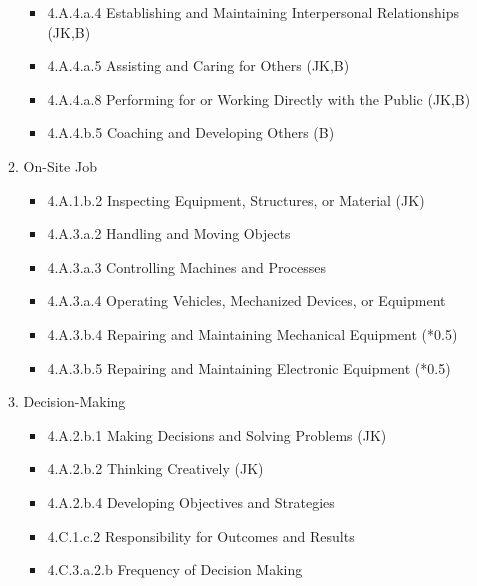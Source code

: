 \begin{enumerate}[A.]
\begin{enumerate}[1.]
\begin{itemize}
  \item 4.A.4.a.4 Establishing and Maintaining Interpersonal Relationships (JK,B)
  \item 4.A.4.a.5 Assisting and Caring for Others (JK,B) 
  \item 4.A.4.a.8 Performing for or Working Directly with the Public (JK,B) 
  \item 4.A.4.b.5 Coaching and Developing Others (B)
\end{itemize}
\item On-Site Job 
\begin{itemize}
  \item 4.A.1.b.2 Inspecting Equipment, Structures, or Material (JK) 
  \item 4.A.3.a.2 Handling and Moving Objects 
  \item 4.A.3.a.3 Controlling Machines and Processes 
  \item 4.A.3.a.4 Operating Vehicles, Mechanized Devices, or Equipment 
  \item 4.A.3.b.4 Repairing and Maintaining Mechanical Equipment (*0.5) 
  \item 4.A.3.b.5 Repairing and Maintaining Electronic Equipment (*0.5)
\end{itemize}
\item Decision-Making 
\begin{itemize}
\item 4.A.2.b.1 Making Decisions and Solving Problems (JK) 
\item 4.A.2.b.2 Thinking Creatively (JK) 
\item 4.A.2.b.4 Developing Objectives and Strategies 
\item 4.C.1.c.2 Responsibility for Outcomes and Results 
\item 4.C.3.a.2.b Frequency of Decision Making
\end{itemize}
\end{enumerate}
\end{enumerate}

